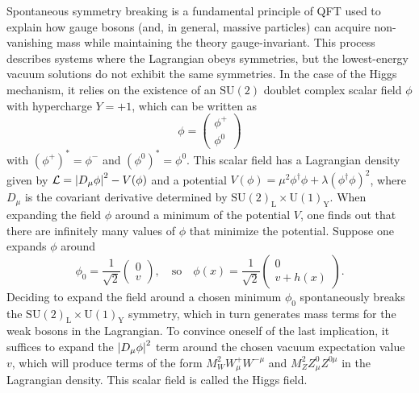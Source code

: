 Spontaneous symmetry breaking is a fundamental principle of QFT used to explain how gauge bosons (and, in general, massive particles) can acquire non-vanishing mass while maintaining the theory gauge-invariant. This process describes systems where the Lagrangian obeys symmetries, but the lowest-energy vacuum solutions do not exhibit the same symmetries. In the case of the Higgs mechanism, it relies on the existence of an $\text{SU}(2)$ doublet complex scalar field $\phi$ with hypercharge $Y = +1$, which can be written as 
\begin{equation*}
    \phi=
    \begin{pmatrix}
        \phi^{+} \\
        \phi^{0}
    \end{pmatrix}
\end{equation*}
with $(\phi^{+})^{*}=\phi^{-}$ and $(\phi^{0})^{*}=\phi^{0}$. This scalar field has a Lagrangian density given by $\mathcal{L}=\left\lvert D_{\mu}\phi\right\rvert^2 - V(\phi)$ and a potential $V(\phi) = \mu^2\phi^\dag\phi+\lambda(\phi^\dag\phi)^2$, where $D_\mu$ is the covariant derivative determined by $\text{SU}(2)_{\text{L}}\times \text{U}(1)_{\text{Y}}$. When expanding the field $\phi$ around a minimum of the potential $V$, one finds out that there are infinitely many values of $\phi$ that minimize the potential. Suppose one expands $\phi$ around
\begin{equation*}
    \phi_{0}=\frac{1}{\sqrt{2}}
    \begin{pmatrix}
        0 \\
        v
    \end{pmatrix},\quad \text{so}\quad
    \phi(x)=\frac{1}{\sqrt{2}}
    \begin{pmatrix}
        0 \\
        v + h(x)
    \end{pmatrix}.
\end{equation*}
Deciding to expand the field around a chosen minimum $\phi_{0}$ spontaneously breaks the $\text{SU}(2)_{\text{L}}\times \text{U}(1)_{\text{Y}}$ symmetry, which in turn generates mass terms for the weak bosons in the Lagrangian. To convince oneself of the last implication, it suffices to expand the $\left\lvert D_{\mu}\phi\right\rvert^2$ term around the chosen vacuum expectation value $v$, which will produce terms of the form $M_{W}^2W_\mu^{+}W^{-\mu}$ and $M_{Z}^2Z_\mu^{0}Z^{0\mu}$ in the Lagrangian density. This scalar field is called the Higgs field.

